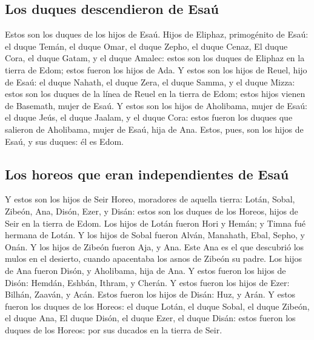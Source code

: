 \hypertarget{los-duques-descendieron-de-esauxfa}{%
\subsection{Los duques descendieron de
Esaú}\label{los-duques-descendieron-de-esauxfa}}

 Estos son los duques de los hijos de Esaú. Hijos de
Eliphaz, primogénito de Esaú: el duque Temán, el duque Omar, el duque
Zepho, el duque Cenaz,  El duque Cora, el duque Gatam, y
el duque Amalec: estos son los duques de Eliphaz en la tierra de Edom;
estos fueron los hijos de Ada.  Y estos son los hijos de
Reuel, hijo de Esaú: el duque Nahath, el duque Zera, el duque Samma, y
el duque Mizza: estos son los duques de la línea de Reuel en la tierra
de Edom; estos hijos vienen de Basemath, mujer de Esaú. 
Y estos son los hijos de Aholibama, mujer de Esaú: el duque Jeús, el
duque Jaalam, y el duque Cora: estos fueron los duques que salieron de
Aholibama, mujer de Esaú, hija de Ana.  Estos, pues, son
los hijos de Esaú, y sus duques: él es Edom.

\hypertarget{los-horeos-que-eran-independientes-de-esauxfa}{%
\subsection{Los horeos que eran independientes de
Esaú}\label{los-horeos-que-eran-independientes-de-esauxfa}}

 Y estos son los hijos de Seir Horeo, moradores de
aquella tierra: Lotán, Sobal, Zibeón, Ana,  Disón, Ezer,
y Disán: estos son los duques de los Horeos, hijos de Seir en la tierra
de Edom.  Los hijos de Lotán fueron Hori y Hemán; y Timna
fué hermana de Lotán.  Y los hijos de Sobal fueron Alván,
Manahath, Ebal, Sepho, y Onán.  Y los hijos de Zibeón
fueron Aja, y Ana. Este Ana es el que descubrió los mulos en el
desierto, cuando apacentaba los asnos de Zibeón su padre.
 Los hijos de Ana fueron Disón, y Aholibama, hija de Ana.
 Y estos fueron los hijos de Disón: Hemdán, Eshbán,
Ithram, y Cherán.  Y estos fueron los hijos de Ezer:
Bilhán, Zaaván, y Acán.  Estos fueron los hijos de Disán:
Huz, y Arán.  Y estos fueron los duques de los Horeos: el
duque Lotán, el duque Sobal, el duque Zibeón, el duque Ana,
 El duque Disón, el duque Ezer, el duque Disán: estos
fueron los duques de los Horeos: por sus ducados en la tierra de Seir.

